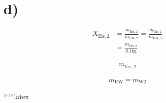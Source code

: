 

\section*{d)}

\begin{align*}
X_{\text{Eis},2} &= \frac{m_{\text{Eis},2}}{m_{\text{EW},2}} = \frac{m_{\text{Eis},2}}{m_{\text{EW},2}} \\
&= \frac{m_{\text{Eis},2}}{0.1 \text{kg}}
\end{align*}

\begin{align*}
m_{\text{Eis},2}
\end{align*}

\begin{align*}
m_{\text{EW}} = m_{\text{W2}}
\end{align*}

``````latex